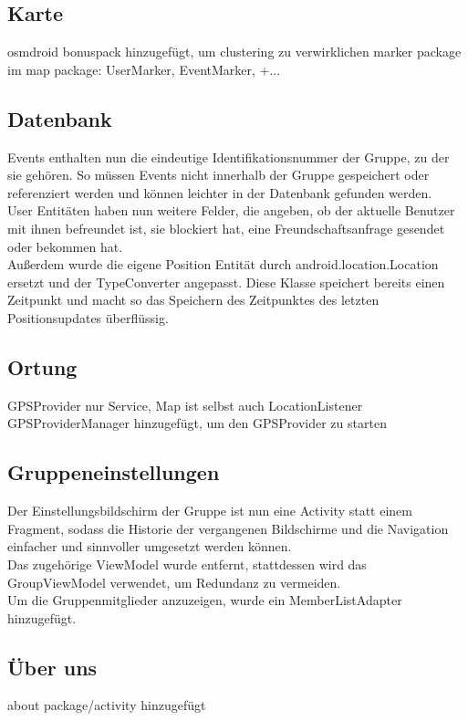 \documentclass[parskip=full,11pt]{scrartcl}
\begin{document}
\subsection{Karte}
osmdroid bonuspack hinzugefügt, um clustering zu verwirklichen
marker package im map package: UserMarker, EventMarker, +...

\subsection{Datenbank}
Events enthalten nun die eindeutige Identifikationsnummer der Gruppe,
zu der sie gehören. So müssen Events nicht innerhalb der Gruppe
gespeichert oder referenziert werden und können leichter in der
Datenbank gefunden werden.\\
User Entitäten haben nun weitere Felder, die angeben, ob der aktuelle Benutzer
mit ihnen befreundet ist, sie blockiert hat, eine Freundschaftsanfrage
gesendet oder bekommen hat.\\
Außerdem wurde die eigene Position Entität durch android.location.Location
ersetzt und der TypeConverter angepasst. Diese Klasse speichert bereits
einen Zeitpunkt und macht so das Speichern des Zeitpunktes des letzten
Positionsupdates überflüssig.

\subsection{Ortung}
GPSProvider nur Service, Map ist selbst auch LocationListener
GPSProviderManager hinzugefügt, um den GPSProvider zu starten

\subsection{Gruppeneinstellungen}
Der Einstellungsbildschirm der Gruppe ist nun eine Activity statt einem
Fragment, sodass die Historie der vergangenen Bildschirme und die
Navigation einfacher und sinnvoller umgesetzt werden können.\\
Das zugehörige ViewModel wurde entfernt, stattdessen wird das
GroupViewModel verwendet, um Redundanz zu vermeiden.\\
Um die Gruppenmitglieder anzuzeigen, wurde ein MemberListAdapter
hinzugefügt.

\subsection{Über uns}
about package/activity hinzugefügt
\end{document}
